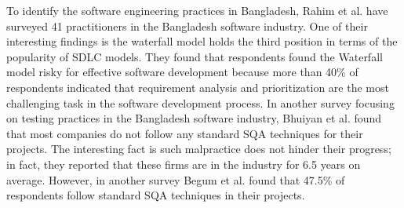 To identify the software engineering practices in Bangladesh, Rahim et al.\cite{Rahim2017} have surveyed 41 practitioners in the Bangladesh software industry. One of their interesting findings is the waterfall model holds the third position in terms of the popularity of SDLC models. They found that respondents found the Waterfall model risky for effective software development because more than 40\% of respondents indicated that requirement analysis and prioritization are the most challenging task in the software development process. In another survey focusing on testing practices in the Bangladesh software industry, Bhuiyan et al.\cite{M2018} found that most companies do not follow any standard SQA techniques for their projects. The interesting fact is such malpractice does not hinder their progress; in fact, they reported that these firms are in the industry for 6.5 years on average. However, in another survey Begum et al.\cite{Begum2009}  found that 47.5\% of respondents follow standard SQA techniques in their projects.
